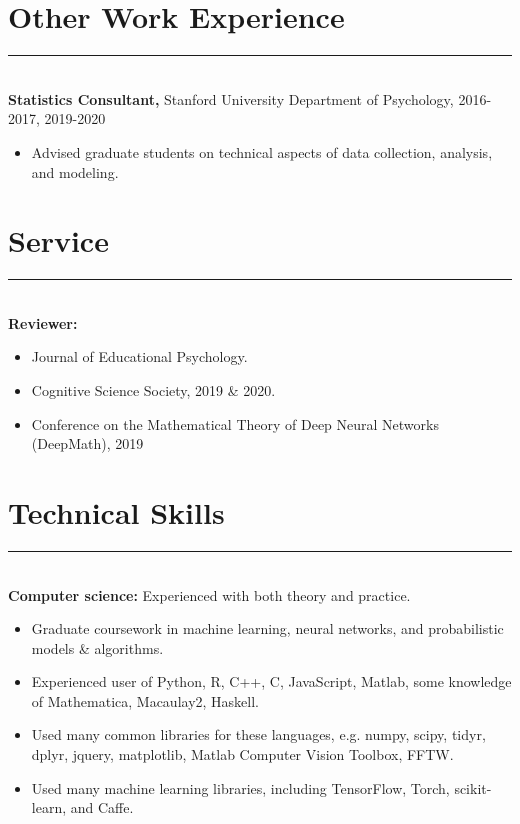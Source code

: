 \documentclass[margin]{res}
\begin{document}
\begin{resume}
\vspace{1pt}\section{Other Work Experience} \vspace{-15pt} \rule{\textwidth}{0.5pt} \\[3pt]
{\bf Statistics Consultant,} Stanford University Department of Psychology, 2016-2017, 2019-2020
\begin{itemize} \itemsep -2pt
 \item Advised graduate students on technical aspects of data collection, analysis, and modeling. \end{itemize}
\vspace{1pt}\section{Service} \vspace{-15pt} \rule{\textwidth}{0.5pt} \\[3pt]
{\bf Reviewer:} 
\begin{itemize} \itemsep -2pt
 \item Journal of Educational Psychology.
 \item Cognitive Science Society, 2019 \& 2020.
 \item Conference on the Mathematical Theory of Deep Neural Networks (DeepMath), 2019\end{itemize}
\vspace{1pt}\section{Technical Skills} \vspace{-15pt} \rule{\textwidth}{0.5pt} \\[3pt]
{\bf Computer science:} Experienced with both theory and practice. 
\begin{itemize} \itemsep -2pt
  \item Graduate coursework in machine learning, neural networks, and probabilistic models \& algorithms.
  \item Experienced user of Python, R, C++, C, JavaScript, Matlab, some knowledge of Mathematica, Macaulay2, Haskell. 
  \item Used many common libraries for these languages, e.g. numpy, scipy, tidyr, dplyr, jquery, matplotlib, Matlab Computer Vision Toolbox, FFTW.
  \item Used many machine learning libraries, including TensorFlow, Torch, scikit-learn, and Caffe.

\end{itemize}
\end{resume}
\end{document}

